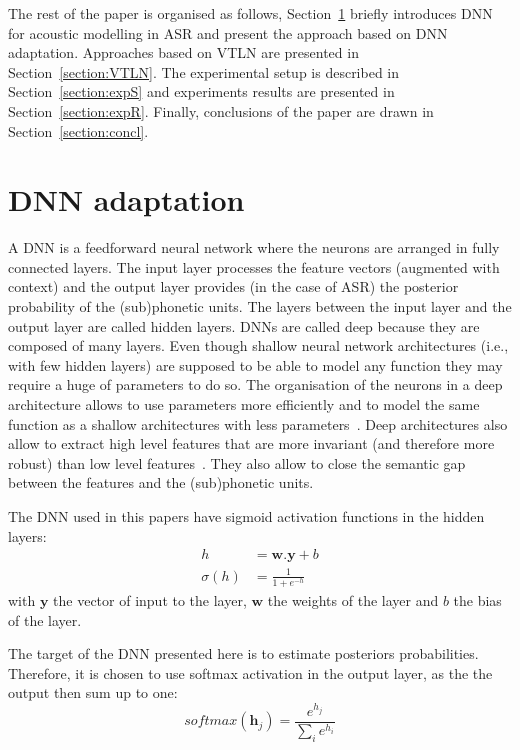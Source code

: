 \documentclass{nle}
\begin{document}
The    rest    of    the    paper    is    organised    as    follows,
Section~\ref{section:DNN}   briefly   introduces   DNN  for   acoustic
modelling   in   ASR  and   present   the   approach   based  on   DNN
adaptation.    Approaches   based   on    VTLN   are    presented   in
Section~\ref{section:VTLN}.  The experimental  setup  is described  in
Section~\ref{section:expS}  and experiments  results are  presented in
Section~\ref{section:expR}.  Finally,  conclusions  of the  paper  are
drawn in Section~\ref{section:concl}.

\section{DNN adaptation}\label{section:DNN}
A DNN is a feedforward neural network where the neurons are arranged in fully connected layers. The input layer processes the feature vectors (augmented with context) and the output layer provides (in the case of ASR) the posterior probability of the (sub)phonetic units. The layers between the input layer and the output layer are called hidden layers. DNNs are called deep because they are composed of many layers. Even though shallow neural network architectures (i.e., with few hidden layers) are supposed to be able to model any function they may require a huge of parameters to do so. The organisation of the neurons in a deep architecture allows to use parameters more efficiently and to model the same function as a shallow architectures with less parameters~\citep*{bengio2013representation}. Deep architectures also allow to extract high level features that are more invariant (and therefore more robust) than low level features~\citep{hinton12}. They also allow to close the 
semantic gap between the features and the (sub)phonetic units. 

The DNN used in this papers have sigmoid activation functions in the hidden layers:
\begin{align}
h & = \textbf{w}.\textbf{y} + b\nonumber\\
  \sigma(h) & = \frac{1}{1+ e^{-h} }\nonumber
\end{align}
with $\textbf{y}$ the vector of input to the layer, $\textbf{w}$ the weights of the layer and $b$ the bias of the layer.

The target of the DNN presented here is to estimate posteriors probabilities. Therefore, it is chosen to use softmax activation in the output layer, as the the output then sum up to one:
\begin{equation}
 softmax(\textbf{h}_j)=\frac{e^{h_j}}{\sum\limits_i e^{h_i}}\nonumber
\end{equation}
\end{document}
